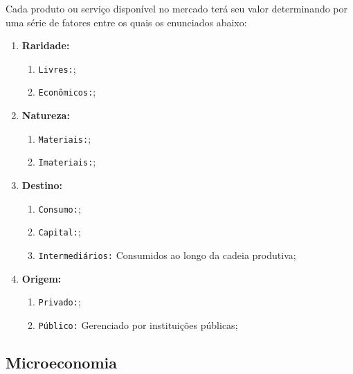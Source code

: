 \documentclass{article}
\begin{document}
            Cada produto ou serviço disponível no mercado terá seu valor determinando por uma série de fatores entre os quais os enunciados abaixo:
                \begin{enumerate}
                    \item \textbf{Raridade:}
                        \begin{enumerate}[noitemsep]
                            \item \texttt{Livres:};
                            \item \texttt{Econômicos:};
                        \end{enumerate}

                    \item \textbf{Natureza:}
                        \begin{enumerate}[noitemsep]
                            \item \texttt{Materiais:};
                            \item \texttt{Imateriais:};
                        \end{enumerate}

                    \item \textbf{Destino:}
                        \begin{enumerate}[noitemsep]
                            \item \texttt{Consumo:};
                            \item \texttt{Capital:};
                            \item \texttt{Intermediários:} Consumidos ao longo da cadeia produtiva;
                        \end{enumerate}

                    \item \textbf{Origem:}
                        \begin{enumerate}[noitemsep]
                            \item \texttt{Privado:};
                            \item \texttt{Público:} Gerenciado por instituições públicas;
                        \end{enumerate}
                \end{enumerate}

        \subsection{Microeconomia}
\end{document}
